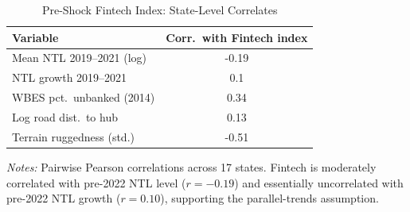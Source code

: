\begin{table}[H]\begin{threeparttable}
\caption{Pre-Shock Fintech Index: State-Level Correlates}
\label{atab:fintech_correlates}\small
\begin{tabular}{lc}\toprule
Variable & Corr.\ with Fintech index \\\midrule
Mean NTL 2019--2021 (log) & -0.19 \\
NTL growth 2019--2021 & 0.1 \\
WBES pct.\ unbanked (2014) & 0.34 \\
Log road dist.\ to hub & 0.13 \\
Terrain ruggedness (std.) & -0.51 \\
\bottomrule\end{tabular}
\begin{tablenotes}\footnotesize
\item \textit{Notes:} Pairwise Pearson correlations across 17 states. Fintech is moderately correlated with pre-2022 NTL level ($r=-0.19$) and essentially uncorrelated with pre-2022 NTL growth ($r=0.10$), supporting the parallel-trends assumption.
\end{tablenotes}\end{threeparttable}\end{table}
